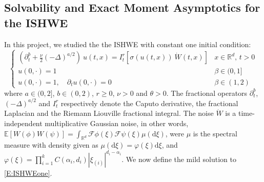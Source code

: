 \documentclass[a4paper,11pt]{article}
\numberwithin{equation}{section}
\theoremstyle{plain}
\theoremstyle{definition}
\newcommand{\ud}{\ensuremath{\mathrm{d} }}
\newcommand{\R}{\mathbb{R}}
\numberwithin{NQ}{section}
\numberwithin{LQ}{section}
\numberwithin{ZQ}{section}
\begin{document}
\subsection{Solvability and Exact Moment Asymptotics for the ISHWE \cite{CE21}}
\hspace{\parindent} In this project, we studied the the ISHWE with constant one initial condition:
	\begin{equation}
	\label{E:ISHWEone}
		\begin{cases}
		\left(\partial^b_t + \frac{\nu}{2}(-\Delta)^{a/2}\right)\: u(t,x) = I^r_t \left[\sigma( u(t,x)) \: \dot W(t,x) \right] & \text{$x\in \R^d$, $t>0$} \\
		u(0,\cdot) = 1                                                                                                            & \beta \in (0,1]               \\
		u(0,\cdot) = 1, \quad \partial_t u(0,\cdot) = 0                                                                            & \beta \in (1,2)
		\end{cases}
	\end{equation}
where $a \in (0,2]$, $b \in (0,2)$, $r\ge 0$, $\nu > 0$ and $\theta>0$. The fractional operators $\partial^b_t$, $(-\Delta)^{a/2}$ and $I^r_t$ respectively denote the Caputo derivative, the fractional Laplacian and the Riemann Liouville fractional integral. The noise $\dot{W}$ is a time-independent multiplicative Gaussian noise, in other words, $\mathbb{E}\left[ W(\phi) W(\psi) \right] = \int_{\R^d} \mathcal{F}\phi(\xi)\mathcal{F}\psi(\xi) \mu(\ud \xi)$, were $\mu$ is the spectral measure with density given as $\mu(\ud \xi) = \varphi(\xi)  \ud \xi$, and $\varphi(\xi) = \prod_{i=1}^k C(\alpha_i,d_i)|\xi_{(i)}|^{d_i-\alpha_i}$. We now define the mild solution to \eqref{E:ISHWEone}.
\end{document}
